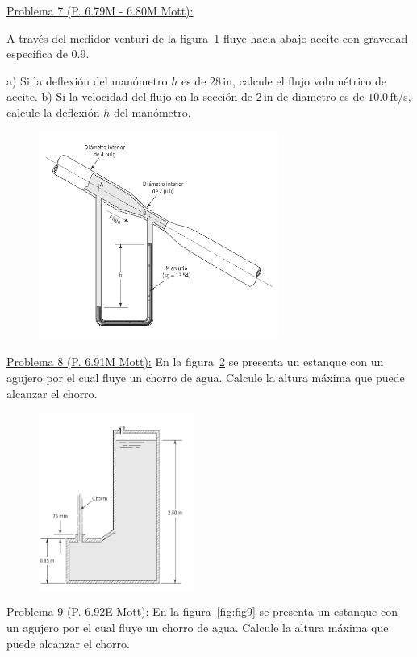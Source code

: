 \documentclass[11pt]{report}
\begin{document}
\newpage 
\underline {Problema 7 (P. 6.79M - 6.80M Mott):}

\vspace{0.2cm}
A trav\'es del medidor venturi de la figura~\ref{fig:fig7} fluye hacia abajo aceite con gravedad espec\'ifica de $0.9$. \newline

a) Si la deflexi\'on del man\'ometro $h$ es de $28$\,in, calcule el flujo volum\'etrico de aceite. \newline
b) Si la velocidad del flujo en la secci\'on de $2$\,in de diametro es de $10.0$\,ft/s, calcule la deflexi\'on $h$ del man\'ometro.
\begin{figure}[H]
\centering\includegraphics[width=0.7\textwidth]{p7.png}
\caption{\label{fig:fig7}}
\end{figure}
\newpage 
\underline {Problema 8 (P. 6.91M Mott):}
En la figura~\ref{fig:fig8} se presenta un estanque con un agujero por el cual fluye un chorro de agua. Calcule la altura m\'axima que puede alcanzar el chorro.

\begin{figure}[H]
\centering\includegraphics[width=0.45\textwidth]{p8.png}
\caption{\label{fig:fig8}}
\end{figure}
\underline {Problema 9 (P. 6.92E Mott):}
En la figura~\ref{fig:fig9} se presenta un estanque con un agujero por el cual fluye un chorro de agua. Calcule la altura m\'axima que puede alcanzar el chorro.
\end{document}
